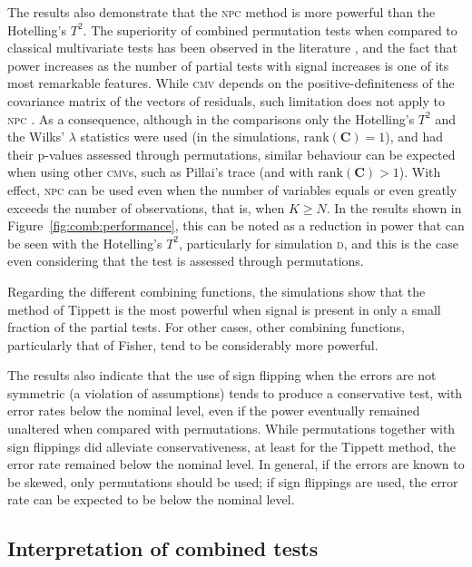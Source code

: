 The results also demonstrate that the \textsc{npc} method is more powerful than the Hotelling's $T^2$. The superiority of combined permutation tests when compared to classical multivariate tests has been observed in the literature \citep{Blair1994}, and the fact that power increases as the number of partial tests with signal increases is one of its most remarkable features. While \textsc{cmv} depends on the positive-definiteness of the covariance matrix of the vectors of residuals, such limitation does not apply to \textsc{npc} \citep{Pesarin2010_finite}. As a consequence, although in the comparisons only the Hotelling's $T^2$ and the Wilks' $\lambda$ statistics were used (in the simulations, $\mathrm{rank}\left(\mathbf{C}\right) = 1$), and had their p-values assessed through permutations, similar behaviour can be expected when using other \textsc{cmv}s, such as Pillai's trace (and with $\mathrm{rank}\left(\mathbf{C}\right) > 1$). With effect, \textsc{npc} can be used even when the number of variables equals or even greatly exceeds the number of observations, that is, when $K \geqslant N$. In the results shown in Figure~\ref{fig:comb:performance}, this can be noted as a reduction in power that can be seen with the Hotelling's $T^2$, particularly for simulation \textsc{d}, and this is the case even considering that the test is assessed through permutations.

Regarding the different combining functions, the simulations show that the method of Tippett is the most powerful when signal is present in only a small fraction of the partial tests. For other cases, other combining functions, particularly that of Fisher, tend to be considerably more powerful.

The results also indicate that the use of sign flipping when the errors are not symmetric (a violation of assumptions) tends to produce a conservative test, with error rates below the nominal level, even if the power eventually remained unaltered when compared with permutations. While permutations together with sign flippings did alleviate conservativeness, at least for the Tippett method, the error rate remained below the nominal level. In general, if the errors are known to be skewed, only permutations should be used; if sign flippings are used, the error rate can be expected to be below the nominal level.

\subsection{Interpretation of combined tests}

